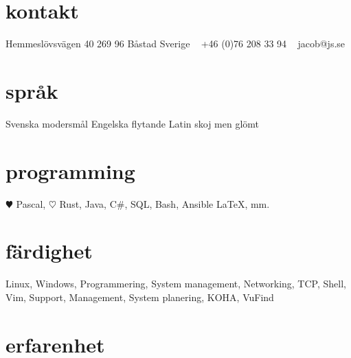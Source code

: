 \documentclass[]{cv-style}          %
\begin{document}
\lastupdated


\begin{aside}
%
\section{kontakt}
Hemmeslövsvägen 40
269 96 Båstad
Sverige
~
+46 (0)76 208 33 94
~
jacob@js.se
%
\section{språk}
Svenska modersmål
Engelska flytande
Latin skoj men glömt
%
\section{programming}
{\color{red} $\varheartsuit$} Pascal, {\color{red} $\heartsuit$} Rust, Java, C\#, SQL, Bash, {\color{orange} }Ansible
\LaTeX{}, mm.
%
\end{aside}


\section{färdighet}
  \vspace{-0.2cm}

  Linux, Windows, Programmering, System management, Networking, TCP, Shell, Vim, Support, Management, System planering, KOHA, VuFind

\section{erfarenhet}
\end{document}
